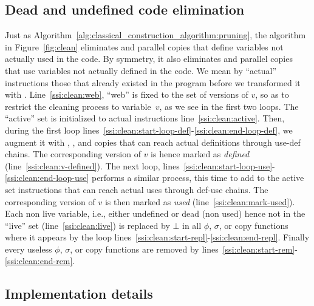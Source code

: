 {\subsection{Dead and undefined code elimination}
Just as Algorithm~\ref{alg:classical_construction_algorithm:pruning}, the algorithm in Figure~\ref{fig:clean} eliminates \phifuns and parallel copies that define variables not actually used in the code. By symmetry, it also eliminates \sigmafuns  and parallel copies  that use variables not actually defined in the code.
We mean by ``actual'' instructions those that already existed in the program before we transformed it with \ssiSplit.
Line~\ref{ssi:clean:web}, ``web'' is fixed to the set of versions of $v$, so as to restrict the cleaning process to variable~$v$, as we see in the first two loops.
The ``active'' set is initialized to actual instructions line~\ref{ssi:clean:active}.
Then, during the first loop lines~\ref{ssi:clean:start-loop-def}-\ref{ssi:clean:end-loop-def}, we augment it with \phifuns, \sigmafuns, and copies that can reach actual definitions through use-def chains.
The corresponding version of $v$ is hence marked as \emph{defined} (line~\ref{ssi:clean:v-defined}).
The next loop, lines~\ref{ssi:clean:start-loop-use}-\ref{ssi:clean:end-loop-use} performs a similar process, this time to add to the active set instructions that can reach actual uses through def-use chains.
The corresponding version of $v$ is then marked as \emph{used} (line~\ref{ssi:clean:mark-used}).
Each non live variable, i.e., either undefined or dead (non used) hence not in the ``live'' set (line~\ref{ssi:clean:live}) is replaced by $\bot$ in all $\phi$, $\sigma$, or copy functions where it appears by the loop lines~\ref{ssi:clean:start-repl}-\ref{ssi:clean:end-repl}.
Finally every useless $\phi$, $\sigma$, or copy functions are removed by lines~\ref{ssi:clean:start-rem}-\ref{ssi:clean:end-rem}.
\subsection{Implementation details}
\label{sub:special}

}
